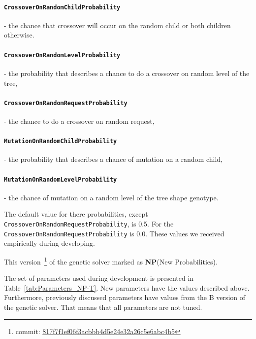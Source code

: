 \paragraph{\texttt{CrossoverOnRandomChildProbability}} - the chance that crossover will occur on the random child or both children otherwise.
\paragraph{\texttt{CrossoverOnRandomLevelProbability}} - the probability that describes a chance to do a crossover on random level of the tree, 
\paragraph{\texttt{CrossoverOnRandomRequestProbability}} - the chance to do a crossover on random request,
\paragraph{\texttt{MutationOnRandomChildProbability}} - the probability that describes a chance of mutation on a random child,
\paragraph{\texttt{MutationOnRandomLevelProbability}} - the chance of mutation on a random level of the tree shape genotype.

The default value for there probabilities, except \texttt{CrossoverOnRandomRequestProbability}, is 0.5. For the \texttt{CrossoverOnRandomRequestProbability} is 0.0. These values we received empirically during developing.

This version~\footnote{commit: \href{https://git-st.inf.tu-dresden.de/mquat/mquat2/commit/817f7f1ef06f3acbbb4d5e24e32a26c5e6abc4b5}{817f7f1ef06f3acbbb4d5e24e32a26c5e6abc4b5}} of the genetic solver marked as \textbf{NP}(New Probabilities).

The set of parameters used during development is presented in Table~\ref{tab:Parameters_NP-T}. New parameters have the values described above. Furthermore, previously discussed parameters have values from the B version of the genetic solver. That means that all parameters are not tuned.

